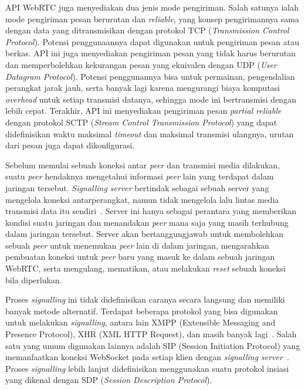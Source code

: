 API WebRTC juga menyediakan dua jenis mode pengiriman. Salah satunya ialah mode pengiriman pesan berurutan dan \textit{reliable}, yang konsep pengirimannya sama dengan data yang ditransmisikan dengan protokol TCP (\textit{Transmission Control Protocol}). Potensi penggunaannya dapat digunakan untuk pengiriman pesan atau berkas. API ini juga menyediakan pengiriman pesan yang tidak harus berurutan dan memperbolehkan kekurangan pesan yang ekuivalen dengan UDP (\textit{User Datagram Protocol}). Potensi penggunannya bisa untuk permainan, pengendalian perangkat jarak jauh, serta banyak lagi karena mengurangi biaya komputasi \textit{overhead} untuk setiap transmisi datanya, sehingga mode ini bertransmisi dengan lebih cepat. Terakhir, API ini menyediakan pengiriman pesan \textit{partial reliable} dengan protokol SCTP (\textit{Stream Control Transmission Protocol}) yang dapat didefinisikan waktu maksimal \textit{timeout} dan maksimal transmisi ulangnya, urutan dari pesan juga dapat dikonfigurasi.

Sebelum memulai sebuah koneksi antar \textit{peer} dan transmisi media dilakukan, suatu \textit{peer} hendaknya mengetahui informasi \textit{peer} lain yang terdapat dalam jaringan tersebut. \textit{Signalling server} bertindak sebagai sebuah server yang mengelola koneksi antarperangkat, namun tidak mengelola lalu lintas media transmisi data itu sendiri~\citep{rfc8839}. Server ini hanya sebagai perantara yang memberikan kondisi suatu jaringan dan menandakan \textit{peer} mana saja yang masih terhubung dalam jaringan tersebut. Server akan bertanggungjawab untuk membolehkan sebuah \textit{peer} untuk menemukan \textit{peer} lain di dalam jaringan, mengarahkan pembuatan koneksi untuk \textit{peer} baru yang masuk ke dalam sebuah jaringan WebRTC, serta mengulang, mematikan, atau melakukan \textit{reset} sebuah koneksi bila diperlukan.

Proses \textit{signalling} ini tidak didefinisikan caranya secara langsung dan memiliki banyak metode alternatif. Terdapat beberapa protokol yang bisa digunakan untuk melakukan \textit{signalling}, antara lain XMPP (Extensible Messaging and Presence Protocol), XHR (XML HTTP Request), dan masih banyak lagi~\citep{sredojev2015webrtc}. Salah satu yang umum digunakan lainnya adalah SIP (Session Initiation Protocol) yang memanfaatkan koneksi WebSocket pada setiap klien dengan \textit{signalling server}~\citep{adeyeye2013determining}. Proses \textit{signalling} lebih lanjut didefinisikan menggunakan suatu protokol insiasi yang dikenal dengan SDP (\textit{Session Description Protocol}).

